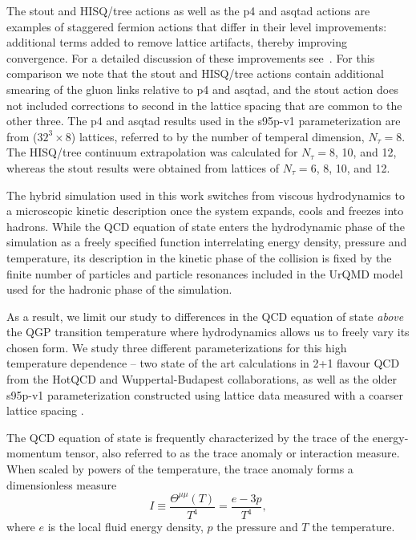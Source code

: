 \documentclass[aps,prc,reprint,amsmath,nofootinbib,superscriptaddress]{revtex4-1}
\begin{document}
The stout and HISQ/tree actions as well as the p4 and asqtad actions are examples of staggered fermion actions that differ in their level improvements: additional terms 
added to remove lattice artifacts, thereby improving convergence.  For a detailed discussion of these improvements see~\cite{Soltz:2015ur}.  For this comparison we note 
that the stout and HISQ/tree actions contain additional smearing of the gluon links relative to p4 and asqtad, and the stout action does not included corrections to second 
in the lattice spacing that are common to the other three.  The p4 and asqtad results used in the s95p-v1 parameterization are from ($32^3 \times 8$) lattices, referred to by 
the number of temperal dimension, $N_{\tau}=8$.  The HISQ/tree continuum extrapolation was calculated for $N_{\tau}=8$, 10, and 12, whereas the stout results were 
obtained from lattices of $N_{\tau}=6$, 8, 10, and 12.

The hybrid simulation used in this work switches from viscous hydrodynamics to a microscopic kinetic description once the system expands, cools and freezes 
into hadrons. While the QCD equation of state enters the hydrodynamic phase of the simulation as a freely specified function interrelating energy density, 
pressure and temperature, its description in the kinetic phase of the collision is fixed by the finite number of particles and particle resonances included 
in the UrQMD model used for the hadronic phase of the simulation.

As a result, we limit our study to differences in the QCD equation of state \emph{above} the QGP transition temperature where hydrodynamics allows us to 
freely vary its chosen form. We study three different parameterizations for this high temperature dependence -- two state of the art calculations 
in 2+1 flavour QCD from the HotQCD \cite{Bazavov:2014pvz} and Wuppertal-Budapest \cite{Borsanyi:2013bia} collaborations, as well as the older s95p-v1 
parameterization \cite{Huovinen:2009yb} constructed using lattice data measured with a coarser lattice spacing \cite{Bazavov:2009zn}.

The QCD equation of state is frequently characterized by the trace of the energy-momentum tensor, also referred to as the trace anomaly or interaction measure. 
When scaled by powers of the temperature, the trace anomaly forms a dimensionless measure
\begin{equation}
 I \equiv \frac{\Theta^{\mu\mu}(T)}{T^4} = \frac{e - 3p}{T^4},
\end{equation}
where $e$ is the local fluid energy density, $p$ the pressure and $T$ the temperature.
\end{document}
